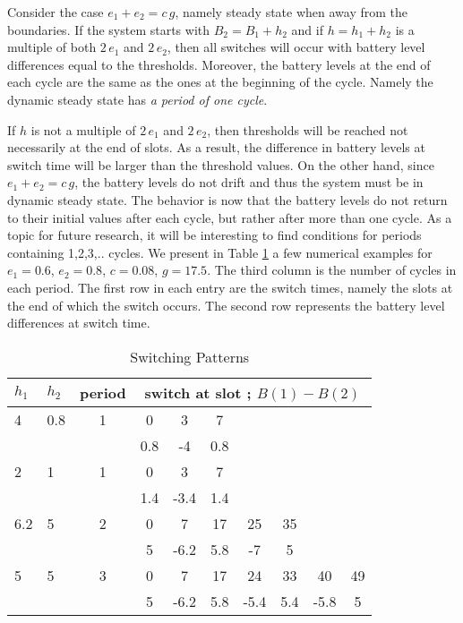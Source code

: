\documentclass[12 pt]{article}
\newcommand{\debug}[1]{\mbox{\tt #1}}
\renewcommand{\debug}[1]{}              \newcommand{\cmd}[1]{}
\newcommand{\2}{\>\>}
\newcommand{\3}{\>\>\>}
\newcommand{\4}{\>\>\>\>}
\newcommand{\5}{\>\>\>\>\>}
\newcommand{\6}{\>\>\>\>\>\>}
\newcommand{\7}{\6\>}
\newcommand{\8}{\6\2}
\newcommand{\dref}[1]{\ref{#1}\debug{[#1]}\cmd{dref}}
\newcounter{protblock}
\newcounter{line}[protblock]
\begin{document}
Consider the case $e_1 + e_2 = c\,g$, namely steady state when away from the boundaries.   If the system starts with $B_2 = B_1 + h_2$ and if $h = h_1 + h_2$ is a multiple of both $2\,e_1$ and $2\,e_2$, then all switches will occur with battery level differences equal to the thresholds. Moreover, the battery levels at the end of each cycle are the same as the ones at the beginning of the cycle.  Namely the dynamic steady state has \emph{a period of one cycle}.

If $h$ is not a multiple of  $2\,e_1$ and $2\,e_2$, then thresholds will be reached not necessarily at the end of slots.  As a result, the difference in battery levels at switch time will be larger than the threshold values.  On the other hand, since $e_1 + e_2 = c\,g$, the battery levels do not drift and thus the system must be in dynamic steady state.  The behavior is now that the battery levels do not return to their initial values after each cycle, but rather after more than one cycle.  As a topic for future research, it will be interesting to find conditions for periods containing 1,2,3,.. cycles.  We present in Table \dref{Table-Patterns} a few numerical examples for $e_1 = 0.6$, $e_2 = 0.8$, $c= 0.08$, $g = 17.5$.  The third column is the number of cycles in each period.  The first row in each entry are the switch times, namely the slots at the end of which the switch occurs. The second row represents the battery level differences at switch time.


\begin{table}[hbtp]
\begin{center}
\begin{tabular}{|l|l|c|c|c|c|c|c|c|c|}
  \hline
$h_1$  &$h_2$ & period & \multicolumn{7}{c|}{switch at slot ;  $B(1)- B(2)$}\\ \hline
   4  &0.8 & 1 & 0   & 3    & 7  & & & &\\
      &    &   & 0.8 & -4 & 0.8  & &  & &\\ \hline
  2   & 1  & 1 & 0   & 3    & 7  & & & &\\
      &    &   & 1.4 & -3.4 & 1.4  & &  & &\\ \hline
  6.2 & 5  & 2 &  0  &  7   & 17  & 25  & 35 & & \\
      &    &   &  5  & -6.2 & 5.8 & -7 & 5 & &  \\ \hline
  5   & 5  & 3 &  0  & 7    & 17  & 24 & 33 &40 &49 \\
      &    &   &  5  & -6.2 & 5.8 & -5.4 & 5.4 & -5.8& 5\\
  \hline
\end{tabular}
\caption{Switching Patterns \debug{\fbox{Table-Patterns}}\label{Table-Patterns}}
\end{center}
\end{table}
\end{document}
